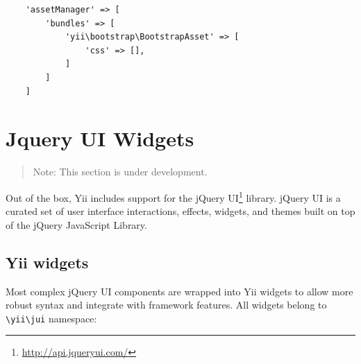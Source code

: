 \lstset{language=php}\begin{lstlisting}
    'assetManager' => [
        'bundles' => [
            'yii\bootstrap\BootstrapAsset' => [
                'css' => [],
            ]
        ]
    ]
\end{lstlisting}


\label{widget-jui.md}\section{Jquery UI Widgets}
\begin{quote}Note: This section is under development.

\end{quote}
Out of the box, Yii includes support for the jQuery UI\footnote{\url{http://api.jqueryui.com/}} library. jQuery UI is a curated set
of user interface interactions, effects, widgets, and themes built on top of the jQuery JavaScript Library.

\subsection{Yii widgets}
Most complex jQuery UI components are wrapped into Yii widgets to allow more robust syntax and integrate with
framework features. All widgets belong to \lstinline|\yii\jui| namespace:

